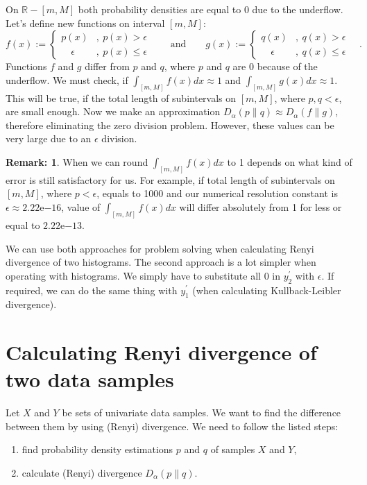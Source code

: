 \documentclass[a4paper, 12pt]{article}
\theoremstyle{definition}
\newtheorem*{remark}{Remark:}
\begin{document}
On $\mathbb{R}-[m, M]$ both probability densities are equal to 0 due to the underflow. Let's define new functions on interval $[m, M]$:
\[
f(x) := 
\begin{cases}
    p(x) &, \  p(x) > \epsilon \\
    \quad \epsilon &, \  p(x) \leq \epsilon
\end{cases}
\quad \quad \text{and} \quad \quad
g(x) := 
\begin{cases}
    q(x) &, \  q(x) > \epsilon \\
    \quad \epsilon &, \  q(x) \leq \epsilon
\end{cases}
\quad .
\]
Functions $f$ and $g$ differ from $p$ and $q$, where $p$ and $q$ are 0 because of the underflow. We must check, if $\int_{[m,M]} f(x) dx \approx 1$ and $\int_{[m,M]} g(x) dx \approx 1$. This will be true, if the total length of subintervals on $[m, M]$, where $p, q < \epsilon$, are small enough. Now we make an approximation $D_\alpha(p \| q) \approx D_\alpha(f \| g)$, therefore eliminating the zero division problem. However, these values can be very large due to an $\epsilon$ division.

\begin{remark}
    When we can round $\int_{[m,M]} f(x) dx$ to 1 depends on what kind of error is still satisfactory for us. For example, if total length of subintervals on $[m, M]$, where $p < \epsilon$, equals to 1000 and our numerical resolution constant is $\epsilon \approx 2.22\mathrm{e}{-16}$, value of $\int_{[m,M]} f(x) dx$ will differ absolutely from 1 for less or equal to $2.22\mathrm{e}{-13}$.
\end{remark}

We can use both approaches for problem solving when calculating Renyi divergence of two histograms. The second approach is a lot simpler when operating with histograms. We simply have to substitute all 0 in $y_2^\prime$ with $\epsilon$. If required, we can do the same thing with $y_1^\prime$ (when calculating Kullback-Leibler divergence).

\pagebreak

\section{Calculating Renyi divergence of two data samples}

Let $X$ and $Y$ be sets of univariate data samples. We want to find the difference between them by using (Renyi) divergence. We need to follow the listed steps:
\begin{enumerate}
	\item find probability density estimations $p$ and $q$ of samples $X$ and $Y$,
	\item calculate (Renyi) divergence $D_\alpha(p \| q)$.
\end{enumerate}
\end{document}
